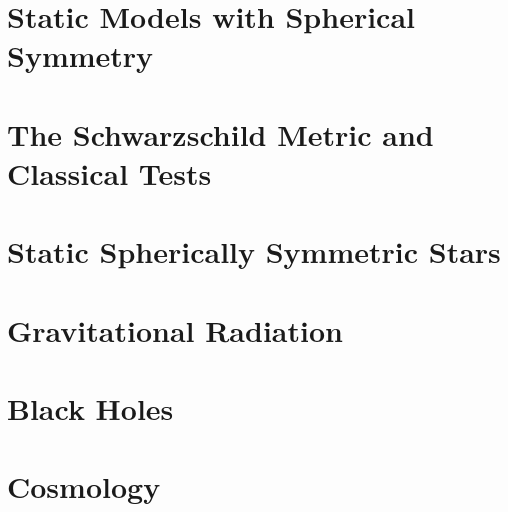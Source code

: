 \documentclass{momento}
\begin{document}
\chapter{Static Models with Spherical Symmetry}
\label{cha:static-models-with}


\chapter{The Schwarzschild Metric and Classical Tests}
\label{cha:schw-metr-class}


\chapter{Static Spherically Symmetric Stars}
\label{cha:einst-equat-stat}


\chapter{Gravitational Radiation}
\label{cha:grav-radi}

\chapter{Black Holes}
\label{cha:black-holes}

\chapter{Cosmology}
\label{cha:cosmology}



\appendices
\end{document}
